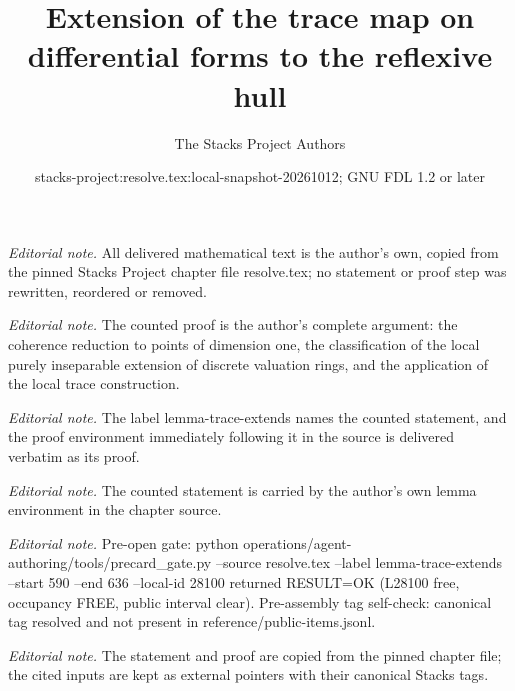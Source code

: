 \documentclass[10pt,a4paper]{amsart}
\title{Extension of the trace map on differential forms to the reflexive hull}
\author{The Stacks Project Authors}
\date{stacks-project:resolve.tex:local-snapshot-20261012; GNU FDL 1.2 or later}
\theoremstyle{plain}
\theoremstyle{definition}
\theoremstyle{remark}
\numberwithin{equation}{subsection}
\begin{document}
\maketitle
\noindent\textit{Editorial note.} All delivered mathematical text is the author's own, copied from the pinned Stacks Project chapter file resolve.tex; no statement or proof step was rewritten, reordered or removed.\par\medskip
\noindent\textit{Editorial note.} The counted proof is the author's complete argument: the coherence reduction to points of dimension one, the classification of the local purely inseparable extension of discrete valuation rings, and the application of the local trace construction.\par\medskip
\noindent\textit{Editorial note.} The label lemma-trace-extends names the counted statement, and the proof environment immediately following it in the source is delivered verbatim as its proof.\par\medskip
\noindent\textit{Editorial note.} The counted statement is carried by the author's own lemma environment in the chapter source.\par\medskip
\noindent\textit{Editorial note.} Pre-open gate: python operations/agent-authoring/tools/precard\_gate.py --source resolve.tex --label lemma-trace-extends --start 590 --end 636 --local-id 28100 returned RESULT=OK (L28100 free, occupancy FREE, public interval clear). Pre-assembly tag self-check: canonical tag resolved and not present in reference/public-items.jsonl.\par\medskip
\noindent\textit{Editorial note.} The statement and proof are copied from the pinned chapter file; the cited inputs are kept as external pointers with their canonical Stacks tags.\par\medskip
\end{document}
